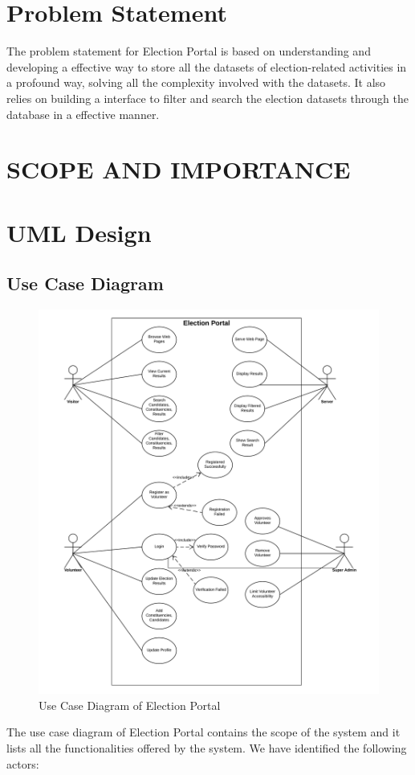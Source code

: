 \documentclass[12pt, a4paper, titlepage]{article}
\begin{document}
\section{Problem Statement}
The problem statement for Election Portal is based on understanding and developing a effective way to store all the datasets of election-related activities in a profound way, solving all the complexity involved with the datasets. It also relies on building a interface to filter and search the election datasets through the database in a effective manner.

\section{SCOPE AND IMPORTANCE}

\newpage
\section{UML Design}
\subsection{Use Case Diagram}
\begin{figure}[ht]
	\includegraphics[scale=0.6]{election_portal_use_case_diagram.png}
	\caption{Use Case Diagram of Election Portal}
\end{figure}
The use case diagram of Election Portal contains the scope of the system and it lists all the functionalities offered by the system. We have identified the following actors:
\end{document}
